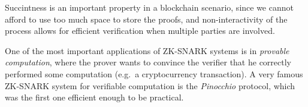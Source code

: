 \noindent Succintness is an important property in a blockchain scenario, since we cannot
afford to use too much space to store the proofs, and non-interactivity of the process allows for
efficient verification when multiple parties are involved.

One of the most important applications of ZK-SNARK systems is in \emph{provable computation},
where the prover wants to convince the verifier that he correctly performed some computation
(e.g.\ a cryptocurrency transaction).
A very famous ZK-SNARK system for verifiable computation is the \emph{Pinocchio} protocol,
which was the first one efficient enough to be practical.
